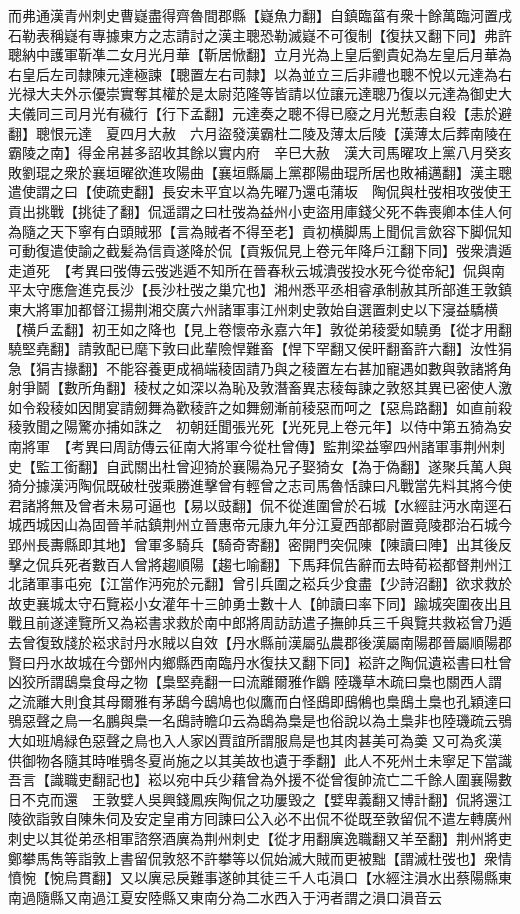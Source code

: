 而弗通漢青州刺史曹嶷盡得齊魯間郡縣【嶷魚力翻】自鎮臨菑有衆十餘萬臨河置戌石勒表稱嶷有專據東方之志請討之漢主聰恐勒滅嶷不可復制【復扶又翻下同】弗許聰納中護軍靳凖二女月光月華【靳居惞翻】立月光為上皇后劉貴妃為左皇后月華為右皇后左司隸陳元達極諫【聰置左右司隸】以為並立三后非禮也聰不悅以元達為右光禄大夫外示優崇實奪其權於是太尉范隆等皆請以位讓元達聰乃復以元達為御史大夫儀同三司月光有穢行【行下孟翻】元達奏之聰不得已廢之月光慙恚自殺【恚於避翻】聰恨元達　夏四月大赦　六月盜發漢霸杜二陵及薄太后陵【漢薄太后葬南陵在霸陵之南】得金帛甚多詔收其餘以實内府　辛巳大赦　漢大司馬曜攻上黨八月癸亥敗劉琨之衆於襄垣曜欲進攻陽曲【襄垣縣屬上黨郡陽曲琨所居也敗補邁翻】漢主聰遣使謂之曰【使疏吏翻】長安未平宜以為先曜乃還屯蒲坂　陶侃與杜弢相攻弢使王貢出挑戰【挑徒了翻】侃遥謂之曰杜弢為益州小吏盜用庫錢父死不犇喪卿本佳人何為隨之天下寧有白頭賊邪【言為賊者不得至老】貢初横脚馬上聞侃言歛容下脚侃知可動復遣使諭之截髪為信貢遂降於侃【貢叛侃見上卷元年降戶江翻下同】弢衆潰遁走道死　【考異曰弢傳云弢逃遁不知所在晉春秋云城潰弢投水死今從帝紀】侃與南平太守應詹進克長沙【長沙杜弢之巢宂也】湘州悉平丞相睿承制赦其所部進王敦鎮東大將軍加都督江揚荆湘交廣六州諸軍事江州刺史敦始自選置刺史以下寖益驕横【横戶孟翻】初王如之降也【見上卷懷帝永嘉六年】敦從弟稜愛如驍勇【從才用翻驍堅堯翻】請敦配已麾下敦曰此輩險悍難畜【悍下罕翻又侯旰翻畜許六翻】汝性狷急【狷吉掾翻】不能容養更成禍端稜固請乃與之稜置左右甚加寵遇如數與敦諸將角射爭鬬【數所角翻】稜杖之如深以為恥及敦潛畜異志稜每諫之敦怒其異已密使人激如令殺稜如因閒宴請劒舞為歡稜許之如舞劒漸前稜惡而呵之【惡烏路翻】如直前殺稜敦聞之陽驚亦捕如誅之　初朝廷聞張光死【光死見上卷元年】以侍中第五猗為安南將軍　【考異曰周訪傳云征南大將軍今從杜曾傳】監荆梁益寧四州諸軍事荆州刺史【監工銜翻】自武關出杜曾迎猗於襄陽為兄子娶猗女【為于偽翻】遂聚兵萬人與猗分據漢沔陶侃既破杜弢乘勝進擊曾有輕曾之志司馬魯恬諫曰凡戰當先料其將今使君諸將無及曾者未易可逼也【易以豉翻】侃不從進圍曾於石城【水經註沔水南逕石城西城因山為固晉羊祜鎮荆州立晉惠帝元康九年分江夏西部都尉置竟陵郡治石城今郢州長夀縣即其地】曾軍多騎兵【騎奇寄翻】密開門突侃陳【陳讀曰陣】出其後反擊之侃兵死者數百人曾將趨順陽【趨七喻翻】下馬拜侃告辭而去時荀崧都督荆州江北諸軍事屯宛【江當作沔宛於元翻】曾引兵圍之崧兵少食盡【少詩沼翻】欲求救於故吏襄城太守石覽崧小女灌年十三帥勇士數十人【帥讀曰率下同】踰城突圍夜出且戰且前遂達覽所又為崧書求救於南中郎將周訪訪遣子撫帥兵三千與覽共救崧曾乃遁去曾復致牋於崧求討丹水賊以自效【丹水縣前漢屬弘農郡後漢屬南陽郡晉屬順陽郡賢曰丹水故城在今鄧州内鄉縣西南臨丹水復扶又翻下同】崧許之陶侃遺崧書曰杜曾凶狡所謂鴟梟食母之物【梟堅堯翻一曰流離爾雅作鶹陸璣草木疏曰梟也關西人謂之流離大則食其母爾雅有茅鴟今鴟鳩也似鷹而白怪䲭即䲭鵂也梟䲭土梟也孔穎達曰鴞惡聲之鳥一名鵬與梟一名䲭詩瞻卬云為鴟為梟是也俗說以為土梟非也陸璣疏云鴞大如班鳩緑色惡聲之鳥也入人家凶賈誼所謂服鳥是也其肉甚美可為羮又可為炙漢供御物各隨其時唯鴞冬夏尚施之以其美故也遺于季翻】此人不死州土未寧足下當識吾言【識職吏翻記也】崧以宛中兵少藉曾為外援不從曾復帥流亡二千餘人圍襄陽數日不克而還　王敦嬖人吳興錢鳳疾陶侃之功屢毁之【嬖卑義翻又博計翻】侃將還江陵欲詣敦自陳朱伺及安定皇甫方囘諫曰公入必不出侃不從既至敦留侃不遣左轉廣州刺史以其從弟丞相軍諮祭酒廙為荆州刺史【從才用翻廙逸職翻又羊至翻】荆州將吏鄭攀馬雋等詣敦上書留侃敦怒不許攀等以侃始滅大賊而更被黜【謂滅杜弢也】衆情憤惋【惋烏貫翻】又以廙忌戾難事遂帥其徒三千人屯溳口【水經注溳水出蔡陽縣東南過隨縣又南過江夏安陸縣又東南分為二水西入于沔者謂之溳口溳音云